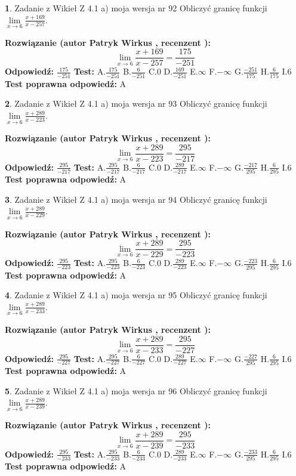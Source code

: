 \documentclass[12pt, a4paper]{article}
\theoremstyle{definition} %
\newtheorem{zad}{}
\newcommand{\zadStart}[1]{\begin{zad}#1\newline}
\newcommand{\zadStop}{\end{zad}}
\newcommand{\rozwStart}[2]{\noindent \textbf{Rozwiązanie (autor #1 , recenzent #2): }\newline}
\newcommand{\rozwStop}{\newline}
\newcommand{\odpStart}{\noindent \textbf{Odpowiedź:}\newline}
\newcommand{\odpStop}{\newline}
\newcommand{\testStart}{\noindent \textbf{Test:}\newline}
\newcommand{\testStop}{\newline}
\newcommand{\kluczStart}{\noindent \textbf{Test poprawna odpowiedź:}\newline}
\newcommand{\kluczStop}{\newline}
\begin{document}
\zadStart{Zadanie z Wikieł Z 4.1 a) moja wersja nr 92}
Obliczyć granicę funkcji $\lim\limits_{x\to6}\frac{x+169}{x-257}$.
\zadStop
\rozwStart{Patryk Wirkus}{}
$$\lim\limits_{x\to6}\frac{x+169}{x-257} = \frac{175}{-251}$$
\rozwStop
\odpStart
$\frac{175}{-251}$
\odpStop
\testStart
A.$\frac{175}{-251}$
B.$\frac{6}{-251}$
C.$0$
D.$\frac{169}{-251}$
E.$\infty$
F.$-\infty$
G.$\frac{-251}{175}$
H.$\frac{6}{175}$
I.$6$
\testStop
\kluczStart
A
\kluczStop



\zadStart{Zadanie z Wikieł Z 4.1 a) moja wersja nr 93}
Obliczyć granicę funkcji $\lim\limits_{x\to6}\frac{x+289}{x-223}$.
\zadStop
\rozwStart{Patryk Wirkus}{}
$$\lim\limits_{x\to6}\frac{x+289}{x-223} = \frac{295}{-217}$$
\rozwStop
\odpStart
$\frac{295}{-217}$
\odpStop
\testStart
A.$\frac{295}{-217}$
B.$\frac{6}{-217}$
C.$0$
D.$\frac{289}{-217}$
E.$\infty$
F.$-\infty$
G.$\frac{-217}{295}$
H.$\frac{6}{295}$
I.$6$
\testStop
\kluczStart
A
\kluczStop



\zadStart{Zadanie z Wikieł Z 4.1 a) moja wersja nr 94}
Obliczyć granicę funkcji $\lim\limits_{x\to6}\frac{x+289}{x-229}$.
\zadStop
\rozwStart{Patryk Wirkus}{}
$$\lim\limits_{x\to6}\frac{x+289}{x-229} = \frac{295}{-223}$$
\rozwStop
\odpStart
$\frac{295}{-223}$
\odpStop
\testStart
A.$\frac{295}{-223}$
B.$\frac{6}{-223}$
C.$0$
D.$\frac{289}{-223}$
E.$\infty$
F.$-\infty$
G.$\frac{-223}{295}$
H.$\frac{6}{295}$
I.$6$
\testStop
\kluczStart
A
\kluczStop



\zadStart{Zadanie z Wikieł Z 4.1 a) moja wersja nr 95}
Obliczyć granicę funkcji $\lim\limits_{x\to6}\frac{x+289}{x-233}$.
\zadStop
\rozwStart{Patryk Wirkus}{}
$$\lim\limits_{x\to6}\frac{x+289}{x-233} = \frac{295}{-227}$$
\rozwStop
\odpStart
$\frac{295}{-227}$
\odpStop
\testStart
A.$\frac{295}{-227}$
B.$\frac{6}{-227}$
C.$0$
D.$\frac{289}{-227}$
E.$\infty$
F.$-\infty$
G.$\frac{-227}{295}$
H.$\frac{6}{295}$
I.$6$
\testStop
\kluczStart
A
\kluczStop



\zadStart{Zadanie z Wikieł Z 4.1 a) moja wersja nr 96}
Obliczyć granicę funkcji $\lim\limits_{x\to6}\frac{x+289}{x-239}$.
\zadStop
\rozwStart{Patryk Wirkus}{}
$$\lim\limits_{x\to6}\frac{x+289}{x-239} = \frac{295}{-233}$$
\rozwStop
\odpStart
$\frac{295}{-233}$
\odpStop
\testStart
A.$\frac{295}{-233}$
B.$\frac{6}{-233}$
C.$0$
D.$\frac{289}{-233}$
E.$\infty$
F.$-\infty$
G.$\frac{-233}{295}$
H.$\frac{6}{295}$
I.$6$
\testStop
\kluczStart
A
\kluczStop
\end{document}
